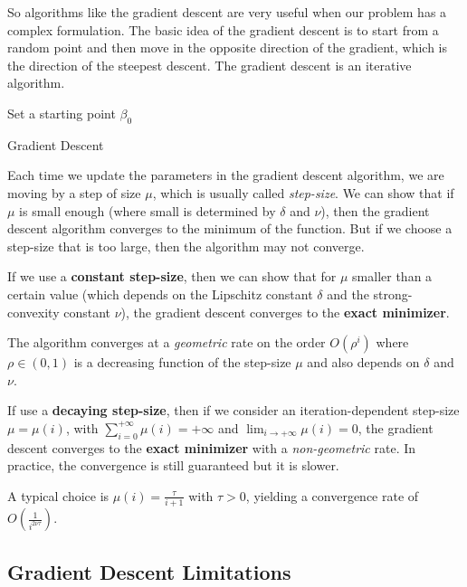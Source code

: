 So algorithms like the gradient descent are very useful when our problem has a complex formulation.
The basic idea of the gradient descent is to start from a random point and then move in the opposite direction of the gradient, which is the direction of the steepest descent. The gradient descent is an iterative algorithm.

\begin{algorithm}[H]
    \SetAlgoLined
    Set a starting point $\beta_0$ \\
    \caption{Gradient Descent}
\end{algorithm}

Each time we update the parameters in the gradient descent algorithm, we are moving by a step of size $\mu$, which is usually called \textit{step-size}. We can show that if $\mu$ is small enough (where small is determined by $\delta$ and $\nu$), then the gradient descent algorithm converges to the minimum of the function. But if we choose a step-size that is too large, then the algorithm may not converge.

If we use a \textbf{constant step-size}, then we can show that for $\mu$ smaller than a certain value (which depends on the Lipschitz constant $\delta$ and the strong-convexity constant $\nu$), the gradient descent converges to the \textbf{exact minimizer}.


The algorithm converges at a \textit{geometric} rate on the order $O(\rho^i)$ where $\rho \in (0,1)$ is a decreasing function of the step-size $\mu$ and also depends on $\delta$ and $\nu$.

If use a \textbf{decaying step-size}, then if we consider an iteration-dependent step-size $\mu = \mu(i)$, with $\sum_{i=0}^{+\infty} \mu(i) = +\infty$ and $\lim_{i \to +\infty} \mu(i) = 0$, the gradient descent converges to the \textbf{exact minimizer} with a \textit{non-geometric} rate. In practice, the convergence is still guaranteed but it is slower.

A typical choice is $\mu(i) = \frac{\tau}{i + 1}$ with $\tau > 0$, yielding a convergence rate of $O(\frac{1}{i^{2 \nu \tau}})$.

\subsection{Gradient Descent Limitations}

